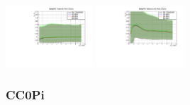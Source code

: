 \begin{center}
  \includegraphics[width=0.245\textwidth]{plots/Elost_profiles/Total_RHC_CCInc.pdf}
  \includegraphics[width=0.245\textwidth]{plots/Elost_profiles/Hadrons_RHC_CCInc.pdf}
  
\end{center}

\subsubsection{CC0Pi}

